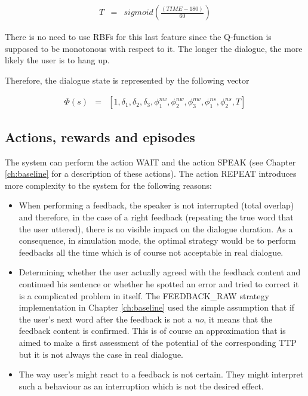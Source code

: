 				\begin{eqnarray}
					T & = & sigmoid(\frac{(TIME-180)}{60})
				\end{eqnarray}
            
       	There is no need to use RBFs for this last feature since the Q-function is supposed to be monotonous with respect to it. The longer the dialogue, the more likely the user is to hang up.
        
        Therefore, the dialogue state is represented by the following vector
        
				\begin{eqnarray}
					\Phi(s) & = & [1,\delta_1,\delta_2,\delta_3,\phi^{nw}_1,\phi^{nw}_2,\phi^{nw}_3,\phi^{ns}_1,\phi^{ns}_2,T]
				\end{eqnarray}
            
   	\subsection{Actions, rewards and episodes}
    
    	The system can perform the action WAIT and the action SPEAK (see Chapter \ref{ch:baseline} for a description of these actions). The action REPEAT introduces more complexity to the system for the following reasons:
			
			\begin{itemize}
				\item When performing a feedback, the speaker is not interrupted (total overlap) and therefore, in the case of a right feedback (repeating the true word that the user uttered), there is no visible impact on the dialogue duration. As a consequence, in simulation mode, the optimal strategy would be to perform feedbacks all the time which is of course not acceptable in real dialogue.
				\item Determining whether the user actually agreed with the feedback content and continued his sentence or whether he spotted an error and tried to correct it is a complicated problem in itself. The FEEDBACK\_RAW strategy implementation in Chapter \ref{ch:baseline} used the simple assumption that if the user's next word after the feedback is not a \textit{no}, it means that the feedback content is confirmed. This is of course an approximation that is aimed to make a first assessment of the potential of the corresponding TTP but it is not always the case in real dialogue.
				\item The way user's might react to a feedback is not certain. They might interpret such a behaviour as an interruption which is not the desired effect.
			\end{itemize}
			
